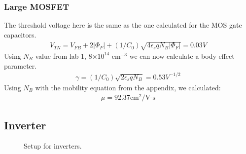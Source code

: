 \documentclass{article}
\providecommand{\e}[1]{\ensuremath{\times 10^{#1}}}
\begin{document}
\subsubsection{Large MOSFET}
The threshold voltage here is the same as the one calculated for the MOS gate capacitors.
\begin{align*}
V_{TN} = V_{FB} + 2|\Phi_F| + (1/C_0)\sqrt{4 \epsilon_s q N_B |\Phi_F|} = 0.03V
\end{align*}
Using $N_B$ value from lab 1, 8\e{14} $\text{cm}^{-3}$ we can now calculate a body effect parameter.
\begin{align*}
\gamma = (1/C_0)\sqrt{2 \epsilon_s q N_B} = 0.53 V^{-1/2}
\end{align*}
Using $N_B$ with the mobility equation from the appendix, we calculated:
\begin{align*}
\mu = 92.37 \text{cm}^{2}/\text{V-s}
\end{align*}


\subsection{Inverter}
\begin{figure}[H]
\centering
{}
\caption{Setup for inverters.}
\end{figure}
\end{document}
